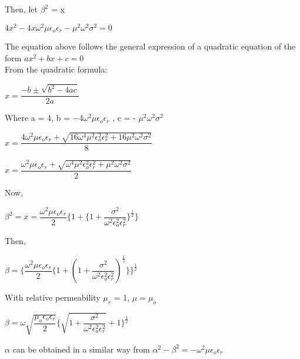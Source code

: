 Then, let $\beta^{2}$ = x
\begin{center}
$4x^{2} -4x\omega^{2}\mu\epsilon_{o}\epsilon_{r} - \mu^{2}\omega^{2}\sigma^{2} = 0$
\end{center}
The equation above follows the general expression of a quadratic equation of the form $ax^2 + bx + c = 0$
\\
From the quadratic formula:

\begin{center}
$x = \dfrac{-b\pm \sqrt{b^{2} - 4ac}}{2a}$
\end{center}

Where a = 4, b = $-4\omega^{2}\mu\epsilon_{o}\epsilon_{r}$ , c = - $\mu^{2}\omega^{2}\sigma^{2}$

\begin{center}
$x = \dfrac{4\omega^{2}\mu\epsilon_{o}\epsilon_{r} + \sqrt{16\omega^{4}\mu^{2}\epsilon_{o}^{2}\epsilon_{r}^{2} + 16\mu^{2}\omega^{2}\sigma^{2}}}{8}$
\end{center}

\begin{center}
$x = \dfrac{\omega^{2}\mu\epsilon_{o}\epsilon_{r} + \sqrt{\omega^{4}\mu^{2}\epsilon_{o}^{2}\epsilon_{r}^{2} + \mu^{2}\omega^{2}\sigma^{2}}}{2}$
\end{center}

Now,
\begin{center}
$\beta^{2} = x = \dfrac{\omega^{2}\mu\epsilon_{o}\epsilon_{r}}{2}\Bigg\{1 + \bigg\{1 + \dfrac{\sigma^{2}}{\omega^{2}\epsilon_{o}^{2}\epsilon_{r}^{2}}\bigg\}^{\frac{1}{2}}\Bigg\}$
\end{center}

Then,

\begin{center}
$\beta =\Bigg\{ \dfrac{\omega^{2}\mu\epsilon_{o}\epsilon_{r}}{2}\bigg\{1 + (1 + \dfrac{\sigma^{2}}{\omega^{2}\epsilon_{o}^{2}\epsilon_{r}^{2}})^{\frac{1}{2}}\bigg\}\Bigg\}^{\frac{1}{2}}$
\end{center}

With relative permeability $\mu_{r}$ = 1, $\mu = \mu_{o}$

\begin{center}
$\beta = \omega\sqrt{\dfrac{\mu_{o}\epsilon_{o}\epsilon_{r}}{2}}\Bigg\{{\sqrt{1 + \dfrac{\sigma^{2}}{\omega^{2}\epsilon_{o}^{2}\epsilon_{r}^{2}}}} + 1\Bigg\}^{\frac{1}{2}}$
\end{center}

$\alpha$ can be obtained in a similar way from $\alpha^{2} - \beta^{2} = -\omega^{2}\mu\epsilon_{o}\epsilon_{r}$

